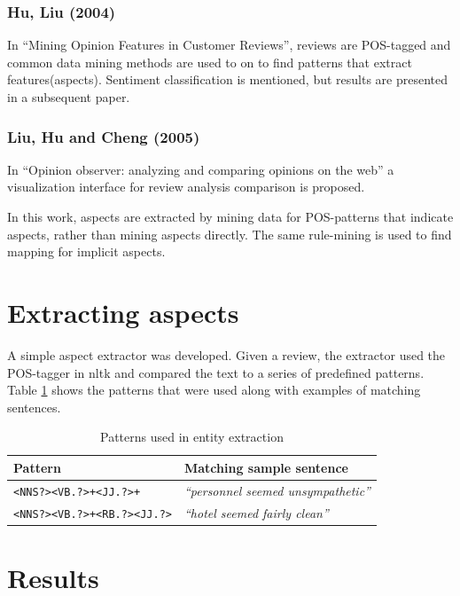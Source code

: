 \documentclass[a4paper,11pt]{kth-mag}
\begin{document}
\subsubsection{Hu, Liu (2004)}
In ``Mining Opinion Features in Customer Reviews'', reviews are POS-tagged and common data mining methods are used to on to find patterns that extract features(aspects). Sentiment classification is mentioned, but results are presented in a subsequent paper.

\subsubsection{Liu, Hu and Cheng (2005)}
In ``Opinion observer: analyzing and comparing opinions on the web'' a visualization interface for review analysis comparison is proposed.

In this work, aspects are extracted by mining data for POS-patterns that indicate aspects, rather than mining aspects directly. The same rule-mining is used to find mapping for implicit aspects.

\newpage
\section{Extracting aspects}
A simple aspect extractor was developed. Given a review, the extractor used the POS-tagger in nltk\cite{nltk} and compared the text to a series of predefined patterns. Table \ref{sample_pos} shows the patterns that were used along with examples of matching sentences.
\newcommand{\ExtrPatOne}{\texttt{<NNS?><VB.?>+<JJ.?>+}}
\newcommand{\ExtrPatTwo}{\texttt{<NNS?><VB.?>+<RB.?><JJ.?>}}

\begin{table}[t]
  \centering
  \begin{tabular}{| l | l |}
    \hline
    \textbf{Pattern} & \textbf{Matching sample sentence}\\ \hline
    \ExtrPatOne & \emph{``personnel seemed unsympathetic''}\\
    \ExtrPatTwo & \emph{``hotel seemed fairly clean''}\\ \hline
  \end{tabular}
  \caption{Patterns used in entity extraction}
  \label{sample_pos}
\end{table}

\section{Results}
\end{document}
